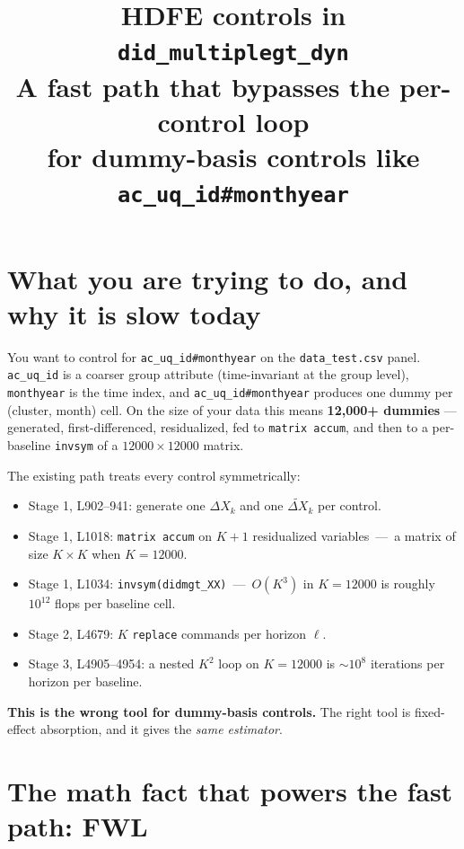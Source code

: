 \documentclass[11pt]{article}
\title{\textbf{HDFE controls in \texttt{did\_multiplegt\_dyn}}\\[3pt]
       \large A fast path that bypasses the per-control loop \\
       \large for dummy-basis controls like \texttt{ac\_uq\_id\#monthyear}}
\author{}
\date{}
\newcommand{\code}[1]{\texttt{\small #1}}
\newcommand{\1}{\mathbb{1}}
\begin{document}
\maketitle

\section{What you are trying to do, and why it is slow today}

You want to control for \code{ac\_uq\_id\#monthyear} on the
\code{data\_test.csv} panel. \code{ac\_uq\_id} is a coarser group attribute
(time-invariant at the group level), \code{monthyear} is the time index, and
\code{ac\_uq\_id\#monthyear} produces one dummy per (cluster, month) cell.
On the size of your data this means \textbf{12{,}000+ dummies} ---
generated, first-differenced, residualized, fed to \code{matrix accum},
and then to a per-baseline \code{invsym} of a $12000 \times 12000$ matrix.

\begin{tcolorbox}[colback=codebg, colframe=warn, boxrule=0.6pt, arc=1pt,
                  title=\textcolor{warn}{\textbf{Why naive \code{controls()} is intractable here}}]
The existing path treats every control symmetrically:
\begin{itemize}[leftmargin=*, itemsep=0pt]
\item Stage 1, L902--941: generate one $\Delta X_k$ and one
      $\widetilde{\Delta X}_k$ per control.
\item Stage 1, L1018: \code{matrix accum} on $K+1$ residualized variables
      \,---\, a matrix of size $K \times K$ when $K = 12000$.
\item Stage 1, L1034: \code{invsym(didmgt\_XX)} \,---\, $O(K^3)$ in $K=12000$
      is roughly $10^{12}$ flops per baseline cell.
\item Stage 2, L4679: $K$ \code{replace} commands per horizon $\ell$.
\item Stage 3, L4905--4954: a nested $K^2$ loop on $K=12000$ is $\sim 10^8$
      iterations per horizon per baseline.
\end{itemize}
\textbf{This is the wrong tool for dummy-basis controls.} The right tool is
fixed-effect absorption, and it gives the \emph{same estimator}.
\end{tcolorbox}

\section{The math fact that powers the fast path: FWL}
\end{document}
